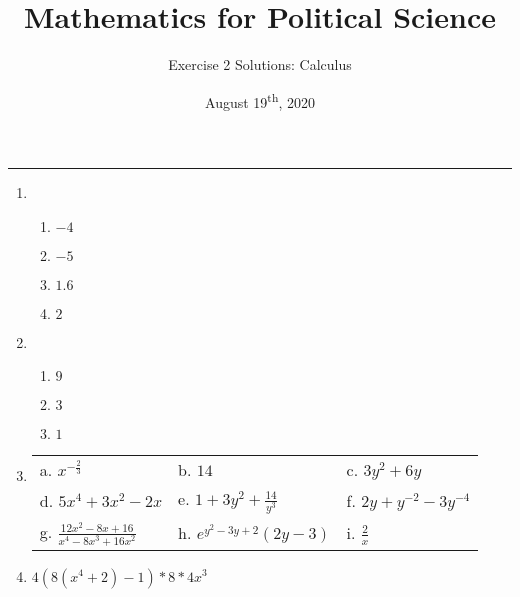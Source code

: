 \documentclass[11pt]{article}
\title{\Large{\bf{\vspace{-100pt}Mathematics for Political Science \vspace{-15pt}}}}
\author{\large{Exercise 2 Solutions: Calculus }}
\date{August 19\textsuperscript{th}, 2020}
\begin{document}
\maketitle

\hrule

\vspace{.5cm}

\begin{enumerate}



\item  
\begin{enumerate}
\item $-4$
\item $-5$
\item $1.6$
\item $2$
\end{enumerate}

\vspace{.5cm}

\item 
\begin{enumerate}
\item $9$
\item $3$
\item $1$
\end{enumerate}

\vspace{.5cm}

\item 
\begin{center}
\begin{tabular}{p{4cm}p{4cm}p{4cm}}
a. $x^{-\frac{2}{3}}$            &  b. $14$                          & c. $3y^2 + 6y$              \rule{0cm}{1cm}\\
d. $5x^4 + 3x^2 - 2x$            &  e. $1 + 3y^2 + \frac{14}{y^3}$   & f. $2y + y^{-2} - 3y^{-4}$               \rule{0cm}{1cm}\\
g. $\frac{12x^2 - 8x + 16}{x^4 - 8x^3 + 16x^2}$ & h. $e^{y^2 - 3y + 2} (2y-3)$   & i. $\frac{2}{x}$ \rule{0cm}{1cm}\\
\end{tabular}
\end{center}

\vspace{.5cm}

\item  $4(8(x^4+2)-1)*8*4x^3$

\vspace{.5cm}





\end{enumerate}
\end{document}
